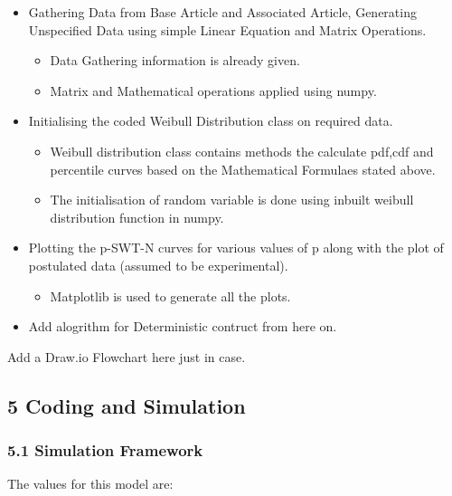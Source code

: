 \documentclass[11pt]{article}
\providecommand{\tightlist}{%
      \setlength{\itemsep}{0pt}\setlength{\parskip}{0pt}}
\begin{document}
\begin{itemize}
\tightlist
\item
  Gathering Data from Base Article and Associated Article, Generating
  Unspecified Data using simple Linear Equation and Matrix Operations.

  \begin{itemize}
  \tightlist
  \item
    Data Gathering information is already given.
  \item
    Matrix and Mathematical operations applied using numpy.
  \end{itemize}
\item
  Initialising the coded Weibull Distribution class on required data.

  \begin{itemize}
  \tightlist
  \item
    Weibull distribution class contains methods the calculate pdf,cdf
    and percentile curves based on the Mathematical Formulaes stated
    above.
  \item
    The initialisation of random variable is done using inbuilt weibull
    distribution function in numpy.
  \end{itemize}
\item
  Plotting the p-SWT-N curves for various values of p along with the
  plot of postulated data (assumed to be experimental).

  \begin{itemize}
  \tightlist
  \item
    Matplotlib is used to generate all the plots.
  \end{itemize}
\item
  Add alogrithm for Deterministic contruct from here on.
\end{itemize}

Add a Draw.io Flowchart here just in case.

\hypertarget{coding-and-simulation}{%
\subsection{5 Coding and Simulation}\label{coding-and-simulation}}

\hypertarget{simulation-framework}{%
\subsubsection{5.1 Simulation Framework}\label{simulation-framework}}

The values for this model are:
\end{document}
